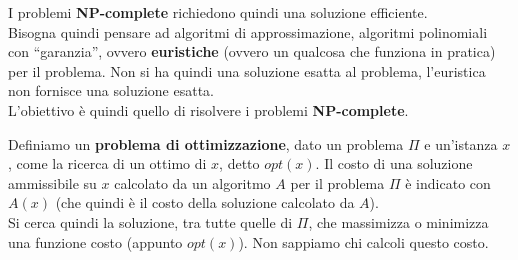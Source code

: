 \documentclass[a4paper,12pt, oneside]{book}
\begin{document}
I problemi \textbf{NP-complete} richiedono quindi una soluzione efficiente.\\
Bisogna quindi pensare ad algoritmi di approssimazione, algoritmi polinomiali
con ``garanzia'', ovvero \textbf{euristiche} (ovvero un qualcosa che funziona in
pratica) per il problema. Non si ha quindi una soluzione esatta al problema,
l'euristica non fornisce una soluzione esatta.\\
L'obiettivo è quindi quello di risolvere i problemi \textbf{NP-complete}.
\begin{definizione}
  Definiamo un \textbf{problema di ottimizzazione}, dato un problema $\Pi$ e
  un'istanza $x$, come la ricerca di un ottimo di $x$, detto $opt(x)$. Il costo
  di una soluzione ammissibile su $x$ calcolato da un algoritmo $A$ per il
  problema $\Pi$ è indicato con $A(x)$ (che quindi è il costo della soluzione
  calcolato da $A$).\\
  
  Si cerca quindi la soluzione, tra tutte quelle di $\Pi$, che massimizza o
  minimizza una funzione costo (appunto $opt(x)$). Non sappiamo chi calcoli
  questo costo.
\end{definizione}
\end{document}

